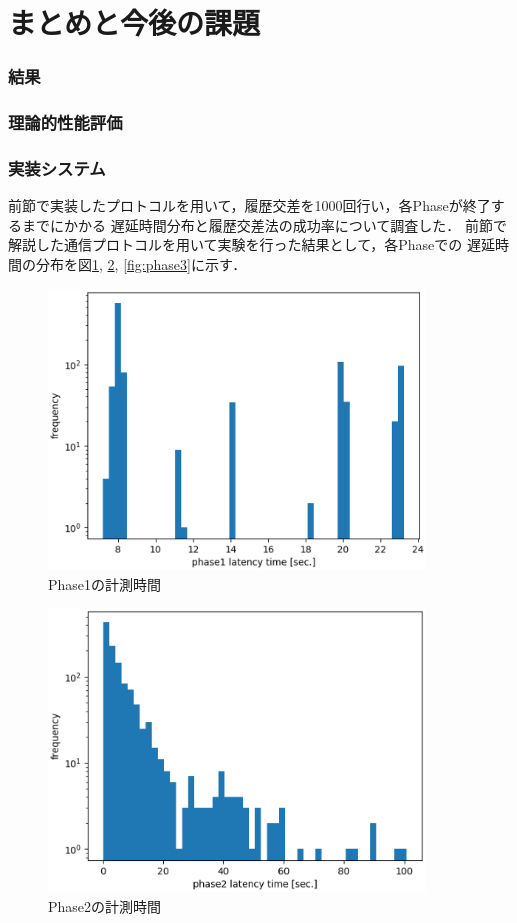 \documentclass[a4paper,12pt]{jsarticle}
\begin{document}
\newpage
\section{まとめと今後の課題}
\subsubsection{結果}
\subsubsection{理論的性能評価}
\subsubsection{実装システム}
前節で実装したプロトコルを用いて，履歴交差を1000回行い，各Phaseが終了するまでにかかる
遅延時間分布と履歴交差法の成功率について調査した．
前節で解説した通信プロトコルを用いて実験を行った結果として，各Phaseでの
遅延時間の分布を図\ref{fig:phase1}, \ref{fig:phase2}, \ref{fig:phase3}に示す．
%
\begin{figure}[H]%
  \begin{center}
    \includegraphics[width=100mm]{pht/phase1-sec-hist.eps}
  \end{center}
  \caption{Phase1の計測時間}
  \label{fig:phase1}
\end{figure}
%
%
\begin{figure}[H]%
  \begin{center}
    \includegraphics[width=100mm]{pht/phase2-sec-hist.eps}
  \end{center}
  \caption{Phase2の計測時間}
  \label{fig:phase2}
\end{figure}
\end{document}
